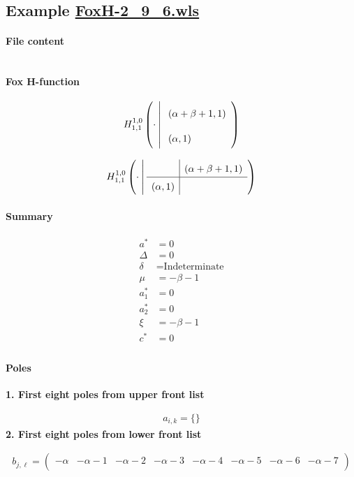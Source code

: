 \documentclass[preview]{standalone}
\begin{document}
\subsection{Example \url{FoxH-2_9_6.wls}}

\paragraph{File content}

\inputminted{text}{../Examples/FoxH-2_9_6.wls}

\paragraph{Fox H-function}

\begin{align*}
  \FoxH
    {1,0}
    {1,1}
    {\cdot}
    {\left(\alpha +\beta +1, 1\right)}
    {\left(\alpha, 1\right)}
\end{align*}

\begin{align*}
  \FoxHext
    {1,0}
    {1,1}
    {\cdot}
    {}
    {\left(\alpha +\beta +1, 1\right)}
    {\left(\alpha, 1\right)}
    {}
\end{align*}

\paragraph{Summary}

\begin{align*}
  a^*    & = 0 \\
  \Delta & = 0 \\
  \delta & = \text{Indeterminate} \\
  \mu    & = -\beta -1 \\
  a_1^*  & = 0 \\
  a_2^*  & = 0 \\
  \xi    & = -\beta -1 \\
  c^*    & = 0 \\
\end{align*}

\paragraph{Poles}

\noindent\textbf{1. First eight poles from upper front list}

\begin{align*}
  a_{i,k} = 
  \{\}
\end{align*}
\noindent\textbf{2. First eight poles from lower front list}

\begin{align*}
  b_{j,\ell} = 
  \left(
\begin{array}{cccccccc}
 -\alpha  & -\alpha -1 & -\alpha -2 & -\alpha -3 & -\alpha -4 & -\alpha -5 & -\alpha -6 & -\alpha -7 \\
\end{array}
\right)
\end{align*}
\end{document}
